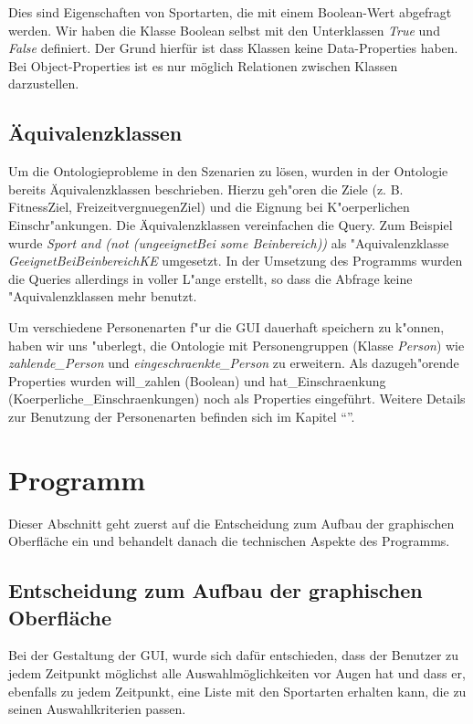 Dies sind Eigenschaften von Sportarten, die mit einem Boolean-Wert abgefragt werden. Wir haben die Klasse Boolean selbst mit den Unterklassen \textit{True} und \textit{False} definiert. Der Grund hierf\"ur ist dass Klassen keine Data-Properties haben. Bei Object-Properties ist es nur m\"oglich Relationen zwischen Klassen darzustellen.  

\subsection{\"Aquivalenzklassen}

Um die Ontologieprobleme in den Szenarien zu l\"osen, wurden in der Ontologie bereits \"Aquivalenzklassen beschrieben. 
Hierzu geh"oren die Ziele (z. B. FitnessZiel, FreizeitvergnuegenZiel) und die Eignung bei K"oerperlichen Einschr"ankungen.
Die Äquivalenzklassen vereinfachen die Query. Zum Beispiel wurde \textit{Sport and (not (ungeeignetBei some Beinbereich))} als "Aquivalenzklasse \textit{GeeignetBeiBeinbereichKE} umgesetzt. In der Umsetzung des Programms wurden die Queries allerdings in voller L"ange erstellt, so dass die Abfrage keine "Aquivalenzklassen mehr benutzt. 


Um verschiedene Personenarten f"ur die GUI dauerhaft speichern zu k"onnen, haben wir uns "uberlegt, die Ontologie mit Personengruppen (Klasse \textit{Person}) wie \textit{zahlende\_Person} und \textit{eingeschraenkte\_Person} zu erweitern. Als dazugeh"orende Properties wurden will\_zahlen (Boolean) und hat\_Einschraenkung (Koerperliche\_Einschraenkungen) noch als Properties eingeführt. Weitere Details zur Benutzung der Personenarten befinden sich im Kapitel "`"'.

\section{Programm}

Dieser Abschnitt geht zuerst auf die Entscheidung zum Aufbau der graphischen Oberfl\"ache ein und behandelt danach die technischen Aspekte des Programms. 

\subsection{Entscheidung zum Aufbau der graphischen Oberfl\"ache}
Bei der Gestaltung der GUI, wurde sich daf\"ur entschieden, dass der Benutzer zu jedem Zeitpunkt m\"oglichst alle Auswahlm\"oglichkeiten vor Augen hat und dass er, ebenfalls zu jedem Zeitpunkt, eine Liste mit den Sportarten erhalten kann, die zu seinen Auswahlkriterien passen.

